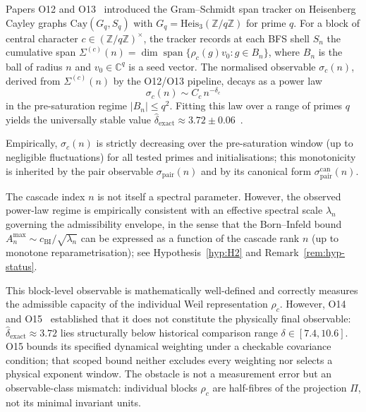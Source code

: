 \documentclass[11pt,a4paper]{article}
\theoremstyle{definition}
\theoremstyle{remark}
\begin{document}
      Papers O12 and O13~\cite{Beau2026a16,Beau2026a17} introduced the
      Gram--Schmidt span tracker on Heisenberg Cayley graphs
      $\mathrm{Cay}(G_q, S_q)$ with
      $G_q = \mathrm{Heis}_3(\mathbb{Z}/q\mathbb{Z})$ for prime $q$.
      For a block of central character
      $c \in (\mathbb{Z}/q\mathbb{Z})^\times$, the tracker records at
      each BFS shell $S_n$ the cumulative span
      $\Sigma^{(c)}(n) =
      \dim \operatorname{span}\{\rho_c(g)v_0 : g \in B_n\}$,
      where $B_n$ is the ball of radius $n$ and $v_0 \in \mathbb{C}^q$ is
      a seed vector.
      The normalised observable $\sigma_c(n)$, derived from
      $\Sigma^{(c)}(n)$ by the O12/O13 pipeline, decays as a power law
      \[
        \sigma_c(n) \sim C_c\, n^{-\delta_c}
      \]
      in the pre-saturation regime $|B_n| \leq q^2$.
      Fitting this law over a range of primes $q$ yields the universally
      stable value
      $\hat{\delta}_{\mathrm{exact}} \approx 3.72 \pm
      0.06$~\cite{Beau2026a16,Beau2026a17}.

      Empirically, $\sigma_c(n)$ is strictly decreasing over the
      pre-saturation window (up to negligible fluctuations) for all tested
      primes and initialisations; this monotonicity is inherited by the
      pair observable $\sigma_{\mathrm{pair}}(n)$ and by its canonical
      form $\sigma_{\mathrm{pair}}^{\mathrm{can}}(n)$.

      The cascade index $n$ is not itself a spectral parameter.
      However, the observed power-law regime is empirically consistent with
      an effective spectral scale $\lambda_n$ governing the admissibility
      envelope, in the sense that the Born--Infeld bound
      $A_n^{\max} \sim c_{\mathrm{BI}} / \sqrt{\lambda_n}$ can be expressed as a
      function of the cascade rank $n$ (up to monotone reparametrisation);
      see Hypothesis~\ref{hyp:H2} and Remark~\ref{rem:hyp-status}.

      This block-level observable is mathematically well-defined and
      correctly measures the admissible capacity of the individual Weil
      representation $\rho_c$.
      However, O14 and O15~\cite{Beau2026a18,Beau2026a19} established that
      it does not constitute the physically final observable:
      $\hat{\delta}_{\mathrm{exact}} \approx 3.72$ lies structurally below
      historical comparison range $\delta\in[7.4,10.6]$.
      O15 bounds its specified dynamical weighting under a checkable covariance condition;
      that scoped bound neither excludes every weighting nor selects a physical exponent window.
      The obstacle is not a measurement error but an observable-class
      mismatch: individual blocks $\rho_c$ are half-fibres of the
      projection $\Pi$, not its minimal invariant units.
\end{document}
